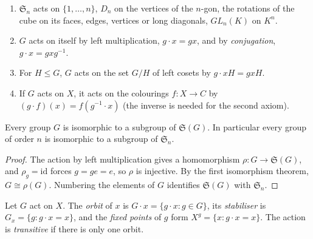 \begin{example}\label{ex:actions}
\begin{enumerate}[label=(\arabic*)]
\item $\mathfrak S_n$ acts on $\{1,\dots,n\}$, $D_n$ on the vertices of the $n$-gon, the rotations of the cube on its faces, edges, vertices or long diagonals, $GL_n(K)$ on $K^n$.
\item $G$ acts on itself by left multiplication, $g\cdot x=gx$, and by \emph{conjugation}, $g\cdot x=gxg^{-1}$.
\item For $H\le G$, $G$ acts on the set $G/H$ of left cosets by $g\cdot xH=gxH$.
\item If $G$ acts on $X$, it acts on the colourings $f:X\to C$ by $(g\cdot f)(x)=f(g^{-1}\cdot x)$ (the inverse is needed for the second axiom).
\end{enumerate}
\end{example}

\begin{theorem}[Cayley]\label{thm:cayley}
Every group $G$ is isomorphic to a subgroup of $\mathfrak S(G)$. In particular every group of order $n$ is isomorphic to a subgroup of $\mathfrak S_n$.
\end{theorem}
\begin{proof}
The action by left multiplication gives a homomorphism $\rho:G\to\mathfrak S(G)$, and $\rho_g=\mathrm{id}$ forces $g=ge=e$, so $\rho$ is injective. By the first isomorphism theorem, $G\cong\rho(G)$. Numbering the elements of $G$ identifies $\mathfrak S(G)$ with $\mathfrak S_n$.
\end{proof}

\begin{definition}
Let $G$ act on $X$. The \emph{orbit} of $x$ is $G\cdot x=\{g\cdot x:g\in G\}$, its \emph{stabiliser} is $G_x=\{g:g\cdot x=x\}$, and the \emph{fixed points} of $g$ form $X^g=\{x:g\cdot x=x\}$. The action is \emph{transitive} if there is only one orbit.
\end{definition}


